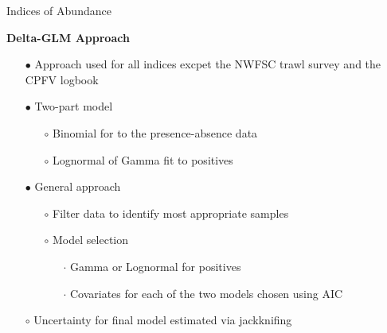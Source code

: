 \documentclass[ignorenonframetext,]{beamer}
\begin{document}
\begin{frame}{Indices of Abundance}

\textbf{Delta-GLM Approach}

\begin{itemize}
\item[$\bullet$] Approach used for all indices excpet the NWFSC trawl survey and the CPFV logbook 
\item[$\bullet$] Two-part model
\begin{itemize}
\item[$\circ$] Binomial for to the presence-absence data
\item[$\circ$] Lognormal of Gamma fit to positives
\end{itemize}
\item[$\bullet$] General approach 
\begin{itemize}
\item[$\circ$] Filter data to identify most appropriate samples 
\item[$\circ$] Model selection
\begin{itemize}
\item[$\cdot$] Gamma or Lognormal for positives
\item[$\cdot$] Covariates for each of the two models chosen using AIC
\end{itemize}
\end{itemize}
\item[$\circ$] Uncertainty for final model estimated via jackknifing 
\end{itemize}

\end{frame}
\end{document}
